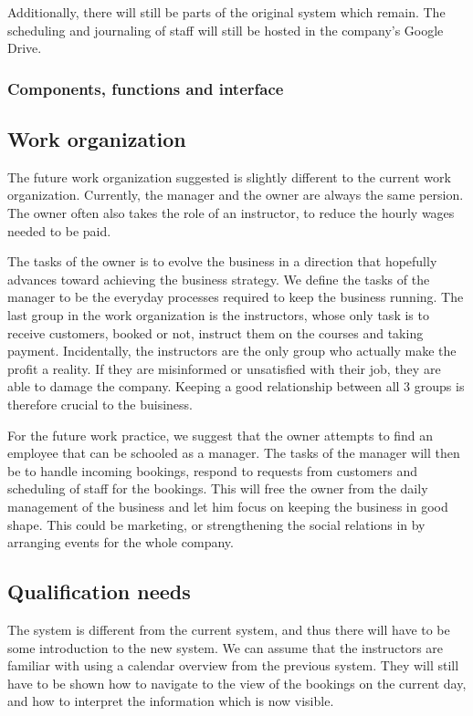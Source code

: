 Additionally, there will still be parts of the original system which remain. 
The scheduling and journaling of staff will still be hosted in the company's 
Google Drive. 

\subsubsection{Components, functions and interface}

\subsection{Work organization}
The future work organization suggested is slightly different to the current 
work organization. Currently, the manager and the owner are always the same 
persion. The owner often also takes the role of an instructor, to reduce the 
hourly wages needed to be paid. 

The tasks of the owner is to evolve the business in a direction that hopefully 
advances toward achieving the business strategy. We define the tasks of the 
manager to be the everyday processes required to keep the business running. The 
last group in the work organization is the instructors, whose only task is to
receive customers, booked or not, instruct them on the courses and taking 
payment. Incidentally, the instructors are the only group who actually make
the profit a reality. If they are misinformed or unsatisfied with their job, 
they are able to damage the company. Keeping a good relationship between all
3 groups is therefore crucial to the buisiness.

For the future work practice, we suggest that the owner attempts to find an 
employee that can be schooled as a manager. The tasks of the manager will then
be to handle incoming bookings, respond to requests from customers and 
scheduling of staff for the bookings. This will free the owner from the daily
management of the business and let him focus on keeping the business in good 
shape. This could be marketing, or strengthening the social relations in 
\gomonkey{} by arranging events for the whole company.

\subsection{Qualification needs}
The system is different from the current system, and thus there will have to be
some introduction to the new system. We can assume that the instructors are 
familiar with using a calendar overview from the previous system. They will 
still have to be shown how to navigate to the view of the bookings on the 
current day, and how to interpret the information which is now visible.

